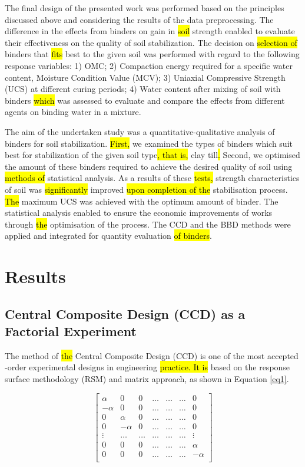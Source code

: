 \documentclass[eprint,
]{actapoly}
\begin{document}
The final design of the presented work was performed based on the principles discussed above and considering the results of the data preprocessing. The difference in the effects from binders on gain in \hl{soil }strength enabled to evaluate their effectiveness on the quality of soil stabilization. The decision on \hl{selection of }binders that \hl{fits }best to the given soil was performed with regard to the following response variables: 1) OMC; 2) Compaction energy required for a specific water content, Moisture Condition Value (MCV); 3) Uniaxial Compressive Strength (UCS) at different curing periods; 4) Water content after mixing of soil with binders \hl{which }was assessed to evaluate and compare the effects from different agents on binding water in a mixture.

The aim of the undertaken study was a quantitative-qualitative analysis of binders for soil stabilization. \hl{First, }we examined the types of binders which suit best for stabilization of the given soil type\hl{, that is, }clay till\hl{. }Second, we optimised the amount of these binders required to achieve the desired quality of soil using \hl{methods of }statistical analysis. As a results of these \hl{tests, }strength characteristics of soil was \hl{significantly }improved\hl{ upon completion of the }stabilisation process. \hl{The }maximum UCS was achieved with the optimum amount of binder. The\hl{ }statistical analysis enabled to ensure the economic improvements of works through \hl{the }optimisation of the process. The CCD and the BBD methods were applied and integrated for quantity evaluation\hl{ of binders}.

\section{Results}
\subsection{Central Composite Design (CCD) as a Factorial Experiment}
The method of \hl{the }Central Composite Design (CCD) is one of the most accepted -order experimental designs in engineering\hl{ practice. It is }based on the response surface methodology (RSM) \cite{Montgomery2019} and matrix approach, as shown in Equation \ref{eq1}. 

\begin{equation}\label{eq1}
\begin{bmatrix}
\alpha & 0 & 0 & \ldots & \ldots & \ldots & 0 \\
-\alpha & 0 & 0 & \ldots & \ldots & \ldots & 0 \\
0 & \alpha & 0 & \ldots & \ldots & \ldots & 0 \\
0 & -\alpha & 0 & \ldots & \ldots & \ldots & 0 \\
\vdots & \ldots & \ldots & \ldots & \ldots & \ldots & \vdots \\
0 & 0 & 0 & \ldots & \ldots & \ldots & \alpha \\
0 & 0 & 0 & \ldots & \ldots & \ldots & -\alpha \\
\end{bmatrix}
\end{equation}
\end{document}
